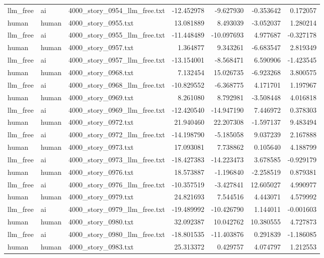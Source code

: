 \begin{longtable}{lllrrrr}
llm\_free & ai & 4000\_story\_0954\_llm\_free.txt & -12.452978 & -9.627930 & -0.353642 & 0.172057 \\
human & human & 4000\_story\_0955.txt & 13.081889 & 8.493039 & -3.052037 & 1.280214 \\
llm\_free & ai & 4000\_story\_0955\_llm\_free.txt & -11.448489 & -10.097693 & 4.977687 & -0.327178 \\
human & human & 4000\_story\_0957.txt & 1.364877 & 9.343261 & -6.683547 & 2.819349 \\
llm\_free & ai & 4000\_story\_0957\_llm\_free.txt & -13.154001 & -8.568471 & 6.590906 & -1.423545 \\
human & human & 4000\_story\_0968.txt & 7.132454 & 15.026735 & -6.923268 & 3.800575 \\
llm\_free & ai & 4000\_story\_0968\_llm\_free.txt & -10.829552 & -6.368775 & 4.171701 & 1.197967 \\
human & human & 4000\_story\_0969.txt & 8.261080 & 8.792981 & -3.508448 & 4.016818 \\
llm\_free & ai & 4000\_story\_0969\_llm\_free.txt & -12.420540 & -14.947190 & 7.446972 & 0.378303 \\
human & human & 4000\_story\_0972.txt & 21.940460 & 22.207308 & -1.597137 & 9.483494 \\
llm\_free & ai & 4000\_story\_0972\_llm\_free.txt & -14.198790 & -5.185058 & 9.037239 & 2.167888 \\
human & human & 4000\_story\_0973.txt & 17.093081 & 7.738862 & 0.105640 & 4.188799 \\
llm\_free & ai & 4000\_story\_0973\_llm\_free.txt & -18.427383 & -14.223473 & 3.678585 & -0.929179 \\
human & human & 4000\_story\_0976.txt & 18.573887 & -1.196840 & -2.258519 & 0.879381 \\
llm\_free & ai & 4000\_story\_0976\_llm\_free.txt & -10.357519 & -3.427841 & 12.605027 & 4.990977 \\
human & human & 4000\_story\_0979.txt & 24.821693 & 7.544516 & 4.443071 & 4.579992 \\
llm\_free & ai & 4000\_story\_0979\_llm\_free.txt & -19.489992 & -10.426790 & 1.144011 & -0.001603 \\
human & human & 4000\_story\_0980.txt & 32.092387 & 10.042762 & 10.380555 & 4.727873 \\
llm\_free & ai & 4000\_story\_0980\_llm\_free.txt & -18.801535 & -11.403876 & 0.291839 & -1.186085 \\
human & human & 4000\_story\_0983.txt & 25.313372 & 0.429757 & 4.074797 & 1.212553 \\

\end{longtable}
